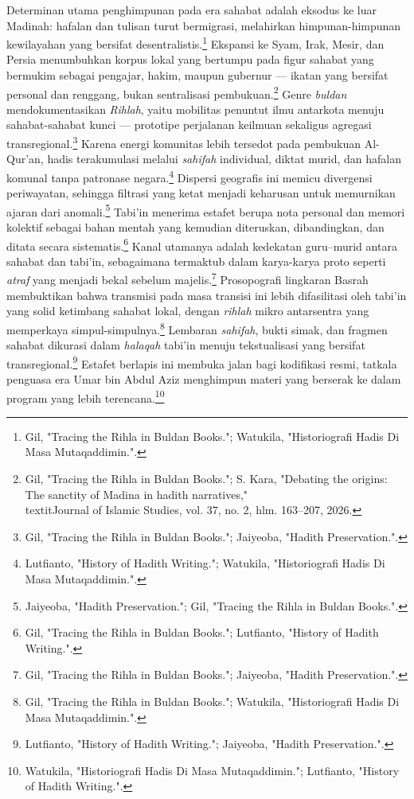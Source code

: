 Determinan utama penghimpunan pada era sahabat adalah eksodus ke luar Madinah: hafalan dan tulisan turut bermigrasi, melahirkan himpunan-himpunan kewilayahan yang bersifat desentralistis.\footnote{Gil, "Tracing the Rihla in Buldan Books."; Watukila, "Historiografi Hadis Di Masa Mutaqaddimin.".} Ekspansi ke Syam, Irak, Mesir, dan Persia menumbuhkan korpus lokal yang bertumpu pada figur sahabat yang bermukim sebagai pengajar, hakim, maupun gubernur --- ikatan yang bersifat personal dan renggang, bukan sentralisasi pembukuan.\footnote{Gil, "Tracing the Rihla in Buldan Books."; S. Kara, "Debating the origins: The sanctity of Madina in hadith narratives," \\textit{Journal of Islamic Studies}, vol. 37, no. 2, hlm. 163--207, 2026.} Genre \textit{buldan} mendokumentasikan \textit{Rihlah}, yaitu mobilitas penuntut ilmu antarkota menuju sahabat-sahabat kunci --- prototipe perjalanan keilmuan sekaligus agregasi transregional.\footnote{Gil, "Tracing the Rihla in Buldan Books."; Jaiyeoba, "Hadith Preservation.".} Karena energi komunitas lebih tersedot pada pembukuan Al-Qur'an, hadis terakumulasi melalui \textit{sahifah} individual, diktat murid, dan hafalan komunal tanpa patronase negara.\footnote{Lutfianto, "History of Hadith Writing."; Watukila, "Historiografi Hadis Di Masa Mutaqaddimin.".} Dispersi geografis ini memicu divergensi periwayatan, sehingga filtrasi yang ketat menjadi keharusan untuk memurnikan ajaran dari anomali.\footnote{Jaiyeoba, "Hadith Preservation."; Gil, "Tracing the Rihla in Buldan Books.".} Tabi'in menerima estafet berupa nota personal dan memori kolektif sebagai bahan mentah yang kemudian diteruskan, dibandingkan, dan ditata secara sistematis.\footnote{Gil, "Tracing the Rihla in Buldan Books."; Lutfianto, "History of Hadith Writing.".} Kanal utamanya adalah kedekatan guru--murid antara sahabat dan tabi'in, sebagaimana termaktub dalam karya-karya proto seperti \textit{atraf} yang menjadi bekal sebelum majelis.\footnote{Gil, "Tracing the Rihla in Buldan Books."; Jaiyeoba, "Hadith Preservation.".} Prosopografi lingkaran Basrah membuktikan bahwa transmisi pada masa transisi ini lebih difasilitasi oleh tabi'in yang solid ketimbang sahabat lokal, dengan \textit{rihlah} mikro antarsentra yang memperkaya simpul-simpulnya.\footnote{Gil, "Tracing the Rihla in Buldan Books."; Watukila, "Historiografi Hadis Di Masa Mutaqaddimin.".} Lembaran \textit{sahifah}, bukti simak, dan fragmen sahabat dikurasi dalam \textit{halaqah} tabi'in menuju tekstualisasi yang bersifat transregional.\footnote{Lutfianto, "History of Hadith Writing."; Jaiyeoba, "Hadith Preservation.".} Estafet berlapis ini membuka jalan bagi kodifikasi resmi, tatkala penguasa era Umar bin Abdul Aziz menghimpun materi yang berserak ke dalam program yang lebih terencana.\footnote{Watukila, "Historiografi Hadis Di Masa Mutaqaddimin."; Lutfianto, "History of Hadith Writing.".}

